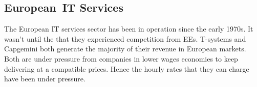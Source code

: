 
\subsection[European IT Services]{European~\gls{IT} Services}

The European IT services sector has been in operation since the early 1970s.
It wasn't until the  that they experienced competition from \glspl{EE}.
T-systems and Capgemini both generate the majority of their revenue in European markets. 
Both are under pressure from companies in lower wages economies to keep delivering at a compatible prices.
Hence the hourly rates that they can charge have been under pressure.

